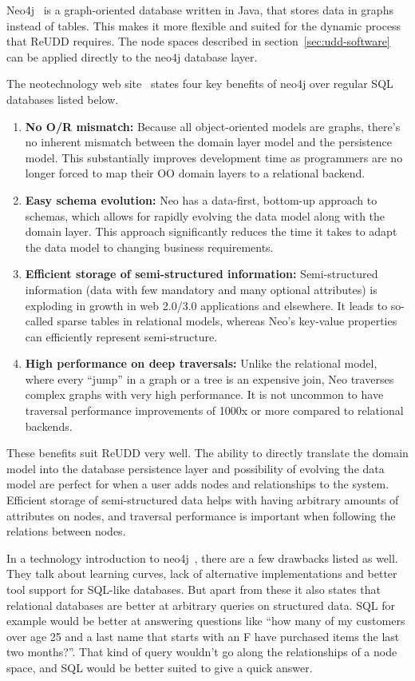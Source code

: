 \documentclass[a4paper]{report}
\begin{document}
Neo4j~\cite{neo4j} is a graph-oriented database written in Java, that stores data in graphs instead of tables. This makes it more flexible and suited for the dynamic process that ReUDD requires. The node spaces described in section~\ref{sec:udd-software} can be applied directly to the neo4j database layer.

The neotechnology web site~\cite{neotechnology-why-neo} states four key benefits of neo4j over regular SQL databases listed below. 

\begin{enumerate}
	\item \textbf{No O/R mismatch:} Because all object-oriented models are graphs, there's no inherent mismatch between the domain layer model and the persistence model. This substantially improves development time as programmers are no longer forced to map their OO domain layers to a relational backend.
	\item \textbf{Easy schema evolution:} Neo has a data-first, bottom-up approach to schemas, which allows for rapidly evolving the data model along with the domain layer. This approach significantly reduces the time it takes to adapt the data model to changing business requirements.
	\item \textbf{Efficient storage of semi-structured information:} Semi-structured information (data with few mandatory and many optional attributes) is exploding in growth in web 2.0/3.0 applications and elsewhere. It leads to so-called sparse tables in relational models, whereas Neo's key-value properties can efficiently represent semi-structure.
	\item \textbf{High performance on deep traversals:} Unlike the relational model, where every ``jump'' in a graph or a tree is an expensive join, Neo traverses complex graphs with very high performance. It is not uncommon to have traversal performance improvements of 1000x or more compared to relational backends.
\end{enumerate}

These benefits suit ReUDD very well. The ability to directly translate the domain model into the database persistence layer and possibility of evolving the data model are perfect for when a user adds nodes and relationships to the system. Efficient storage of semi-structured data helps with having arbitrary amounts of attributes on nodes, and traversal performance is important when following the relations between nodes.

In a technology introduction to neo4j~\cite{neo4j-whitepaper}, there are a few drawbacks listed as well. They talk about learning curves, lack of alternative implementations and better tool support for SQL-like databases. But apart from these it also states that relational databases are better at arbitrary queries on structured data. SQL for example would be better at answering questions like ``how many of my customers over age 25 and a last name that starts with an F have purchased items the last two months?''. That kind of query wouldn't go along the relationships of a node space, and SQL would be better suited to give a quick answer.
\end{document}
